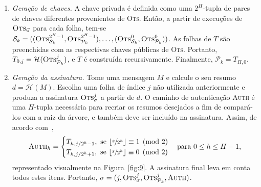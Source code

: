 \documentclass[12pt,notitlepage]{report}
\newcommand{\pk}{\mathcal{P}_k}
\newcommand{\sk}{\mathcal{S}_k}
\newcommand{\hash}[2][]{\mathcal{H}^{#1}(#2)}
\begin{document}
\begin{enumerate}

  \item[] \emph{Geração de chaves.} A chave privada é definida como uma
      $2^{H}$-tupla de pares de chaves diferentes provenientes de \textsc{Ots}.
        Então, a partir de execuções de $\textsc{Ots}_\mathcal{G}$ para cada
        folha, tem-se $\sk{} = ((\textsc{Ots}_{\sk{}}^{2^{H} - 1},
        \textsc{Ots}_{\pk{}}^{2^{H} - 1}), \dots, (\textsc{Ots}_{\sk{}}^{0},
        \textsc{Ots}_{\pk{}}^{0}))$. As folhas de $T$ são preenchidas com as
        respectivas chaves públicas de \textsc{Ots}. Portanto, $T_{0, j} =
        \hash{\textsc{Ots}_{\pk{}}^{j}}$, e $T$ é construída recursivamente.
        Finalmente, $\pk{} = T_{H,0}$.

  \item[] \emph{Geração da assinatura.} Tome uma mensagem $M$ e calcule o seu
      resumo $d = \hash{M}$. Escolha uma folha de índice $j$ não utilizada
        anteriormente e produza a assinatura $\textsc{Ots}_\sigma^{j}$ a
        partir de $d$. O caminho de autenticação \textsc{Auth} é
        uma $H$-tupla necessária para recriar os resumos desejados a fim de
        compará-los com a raiz da árvore, e também deve ser incluído na
        assinatura. Assim, de acordo com~\cite{Bernstein:2008:PQC:1522375},
        \begin{equation}
            \textsc{Auth}_h =
            \begin{cases}
                T_{h, j / 2^h  - 1}, \text{ se } \lfloor \sfrac{s}{2^h} \rfloor \equiv 1 \pmod{2} \\
                T_{h, j / 2^h  + 1}, \text{ se } \lfloor \sfrac{s}{2^h} \rfloor \equiv 0 \pmod{2}
            \end{cases} \text{para } 0 \leq h \leq H - 1,
        \end{equation}
        representado visualmente na Figura~\ref{fig:9}. A assinatura
        final leva em conta todos estes itens. Portanto, $\sigma = (j,
        \textsc{Ots}_\sigma^{j}, \textsc{Ots}_{\pk{}}^{j}, \textsc{Auth})$.


\end{enumerate}
\end{document}

